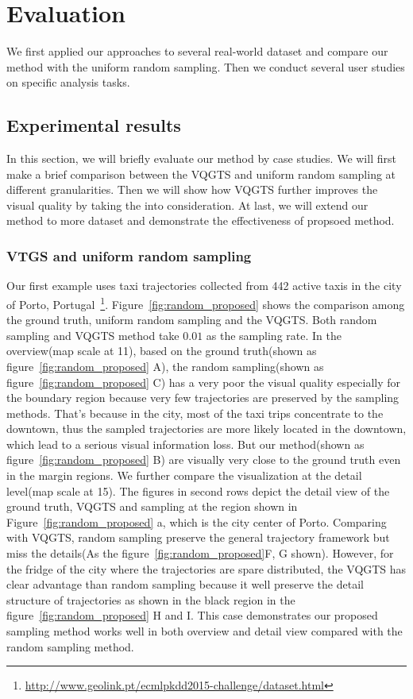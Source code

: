 \section{Evaluation}
We first applied our approaches to several real-world dataset and compare our method with the uniform random sampling. Then we conduct several user studies on specific analysis tasks. 
\subsection{Experimental results}
In this section, we will briefly evaluate our method by case studies. We will first make a brief comparison between the VQGTS and uniform random sampling at different granularities. Then we will show how VQGTS further improves the visual quality by taking the  into consideration. At last, we will extend our method to more dataset and demonstrate the effectiveness of propsoed method.
\subsubsection{VTGS and uniform random sampling}
Our first example uses taxi trajectories collected from 442 active taxis in the city of Porto, Portugal~\footnote{\url{http://www.geolink.pt/ecmlpkdd2015-challenge/dataset.html}}. Figure~\ref{fig:random_proposed} shows the comparison among the ground truth, uniform random sampling and the VQGTS. Both random sampling and VQGTS method take $0.01$ as the sampling rate. 
In the overview(map scale at 11), based on the ground truth(shown as figure~\ref{fig:random_proposed} A), the random sampling(shown as figure~\ref{fig:random_proposed} C) has a very poor the visual quality especially for the boundary region because very few trajectories are preserved by the sampling methods. That's because in the city, most of the taxi trips concentrate to the downtown, thus the sampled trajectories are more likely located in the downtown, which lead to a serious visual information loss.  
But our method(shown as figure~\ref{fig:random_proposed} B) are visually very close to the ground truth even in the margin regions. 
We further compare the visualization at the detail level(map scale at 15).
The figures in second rows depict the detail view of the ground truth, VQGTS and sampling at the region shown in Figure~\ref{fig:random_proposed} a, which is the city center of Porto. Comparing with VQGTS, random sampling preserve the general trajectory framework but miss the details(As the figure~\ref{fig:random_proposed}F, G shown). However, for the fridge of the city where the trajectories are spare distributed, the VQGTS has clear advantage than random sampling because it well preserve the detail structure of trajectories as shown in the black region in the figure~\ref{fig:random_proposed} H and I. This case demonstrates our proposed sampling method works well in both overview and detail view compared with the random sampling method.

